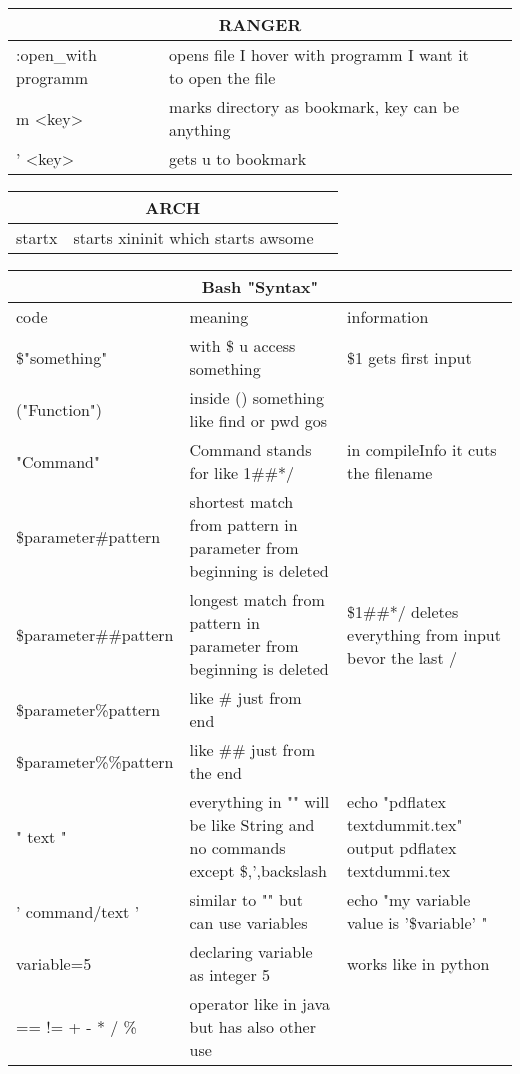 \documentclass[12pt]{article}
\begin{document}
\begin{tabular}{| p{6.5cm} | p{6.5cm} | p{6.5cm} |}
    \hline
    \multicolumn{3}{|c|}{RANGER} \\
    \hline
    :open\_with programm & opens file I hover with programm I want it to open  the file & \\
    \hline
    m <key> & marks directory as bookmark, key can be anything & \\
    \hline
    ' <key> & gets u to bookmark & \\
    \hline
\end{tabular}

\begin{tabular}{| p{6.5cm} | p{6.5cm} | p{6.5cm} |}
    \hline
    \multicolumn{3}{|c|}{ARCH} \\
    \hline
    startx & starts xininit which starts awsome & \\
    \hline
\end{tabular}
\newpage

\centering
\begin{tabular}{| p{6.5cm} | p{6.5cm} | p{6.5cm} |}
    \hline
    \multicolumn{3}{|c|}{Bash "Syntax"} \\
    \hline
    code & meaning & information\\
    \hline
    \$"something" & with \$ u access something & \$1 gets first input\\
    \hline
    ("Function") & inside () something like find or pwd gos &\\
    \hline
    {"Command"} & Command stands for like 1\#\#*/ & in compileInfo it cuts the filename \\
    \hline
    \${parameter\#pattern} & shortest match from pattern in parameter from beginning is deleted &\\
    \hline 
    \${parameter\#\#pattern} & longest match from pattern in parameter from beginning is deleted & \${1\#\#*/} deletes everything from input bevor the last / \\
    \hline
    \${parameter\%pattern} & like \# just from end &\\
    \hline 
    \${parameter\%\%pattern} & like \#\# just from the end &\\
    \hline 
    " text " & everything in "" will be like String and no commands except \$,',backslash & echo "pdflatex textdummit.tex" output pdflatex textdummi.tex \\
    \hline
    ' command/text ' & similar to "" but can use variables & echo "my variable value is '\$variable' " \\
    \hline 
    variable=5 & declaring variable as integer 5 & works like in python \\
    \hline 
    == != + - * / \% & operator like in java but has also other use &\\
    \hline 
\end{tabular}
\end{document}
